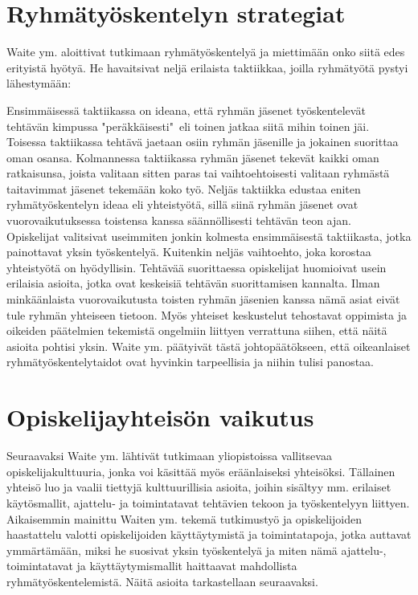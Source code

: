 \documentclass[finnish]{../tktltiki2}
\theoremstyle{definition}
\theoremstyle{remark}
\begin{document}
\section{Ryhmätyöskentelyn strategiat}

Waite ym. aloittivat tutkimaan ryhmätyöskentelyä ja miettimään onko siitä edes erityistä hyötyä. He havaitsivat neljä erilaista taktiikkaa, joilla ryhmätyötä pystyi lähestymään:

Ensimmäisessä taktiikassa on ideana, että ryhmän jäsenet työskentelevät tehtävän kimpussa "peräkkäisesti"~eli toinen jatkaa siitä mihin toinen jäi. Toisessa taktiikassa tehtävä jaetaan osiin ryhmän jäsenille ja jokainen suorittaa oman osansa. Kolmannessa taktiikassa ryhmän jäsenet tekevät kaikki oman ratkaisunsa, joista valitaan sitten paras tai vaihtoehtoisesti valitaan ryhmästä taitavimmat jäsenet tekemään koko työ. Neljäs taktiikka edustaa eniten ryhmätyöskentelyn ideaa eli yhteistyötä, sillä siinä ryhmän jäsenet ovat vuorovaikutuksessa toistensa kanssa säännöllisesti tehtävän teon ajan.\\

Opiskelijat valitsivat useimmiten jonkin kolmesta ensimmäisestä taktiikasta, jotka painottavat yksin työskentelyä. Kuitenkin neljäs vaihtoehto, joka korostaa yhteistyötä on hyödyllisin. Tehtävää suorittaessa opiskelijat huomioivat usein erilaisia asioita, jotka ovat keskeisiä tehtävän suorittamisen kannalta. Ilman minkäänlaista vuorovaikutusta toisten ryhmän jäsenien kanssa nämä asiat eivät tule ryhmän yhteiseen tietoon. Myös yhteiset keskustelut tehostavat oppimista ja oikeiden päätelmien tekemistä ongelmiin liittyen verrattuna siihen, että näitä asioita pohtisi yksin. Waite ym. päätyivät tästä johtopäätökseen, että oikeanlaiset ryhmätyöskentelytaidot ovat hyvinkin tarpeellisia ja niihin tulisi panostaa.

\section{Opiskelijayhteisön vaikutus}

Seuraavaksi Waite ym. lähtivät tutkimaan yliopistoissa vallitsevaa opiskelijakulttuuria, jonka voi käsittää myös eräänlaiseksi yhteisöksi. Tällainen yhteisö luo ja vaalii tiettyjä kulttuurillisia asioita, joihin sisältyy mm. erilaiset käytösmallit, ajattelu- ja toimintatavat tehtävien tekoon ja työskentelyyn liittyen. Aikaisemmin mainittu Waiten ym. tekemä tutkimustyö ja opiskelijoiden haastattelu valotti opiskelijoiden käyttäytymistä ja toimintatapoja, jotka auttavat ymmärtämään, miksi he suosivat yksin työskentelyä ja miten nämä ajattelu-, toimintatavat ja käyttäytymismallit haittaavat mahdollista ryhmätyöskentelemistä. Näitä asioita tarkastellaan seuraavaksi.
\end{document}
